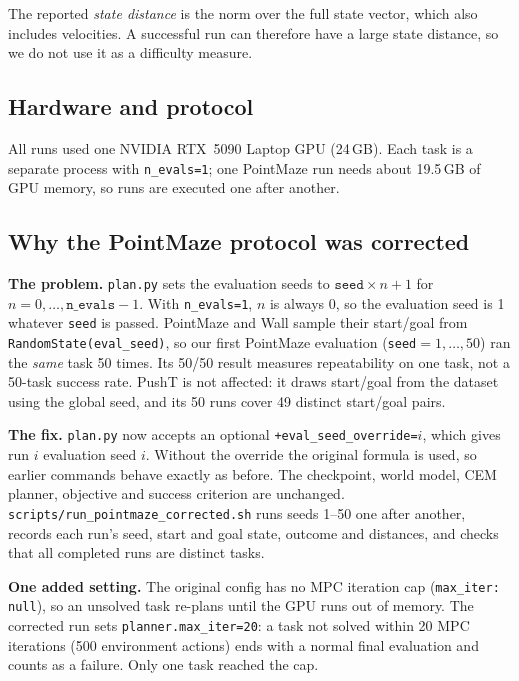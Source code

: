 \documentclass[11pt]{article}
\begin{document}
The reported \emph{state distance} is the norm over the full state vector,
which also includes velocities. A successful run can therefore have a
large state distance, so we do not use it as a difficulty measure.

\subsection{Hardware and protocol}

All runs used one NVIDIA RTX~5090 Laptop GPU (24\,GB). Each task is a separate
process with \texttt{n\_evals=1}; one PointMaze run needs about 19.5\,GB of GPU
memory, so runs are executed one after another.

\subsection{Why the PointMaze protocol was corrected}
\label{sec:seed}

\textbf{The problem.} \texttt{plan.py} sets the evaluation seeds to
$\texttt{seed}\times n + 1$ for $n = 0,\dots,\texttt{n\_evals}-1$. With
\texttt{n\_evals=1}, $n$ is always 0, so the evaluation seed is 1 whatever
\texttt{seed} is passed. PointMaze and Wall sample their start/goal from
\texttt{RandomState(eval\_seed)}, so our first PointMaze evaluation
(\texttt{seed}$=1,\dots,50$) ran the \emph{same} task 50 times. Its 50/50
result measures repeatability on one task, not a 50-task success rate.
PushT is not affected: it draws start/goal from the dataset using the global
seed, and its 50 runs cover 49 distinct start/goal pairs.

\textbf{The fix.} \texttt{plan.py} now accepts an optional
\texttt{+eval\_seed\_override=}$i$, which gives run $i$ evaluation seed $i$.
Without the override the original formula is used, so earlier commands behave
exactly as before. The checkpoint, world model, CEM planner, objective and
success criterion are unchanged. \texttt{scripts/run\_pointmaze\_corrected.sh}
runs seeds 1--50 one after another, records each run's seed, start and goal
state, outcome and distances, and checks that all completed runs are distinct
tasks.

\textbf{One added setting.} The original config has no MPC iteration cap
(\texttt{max\_iter: null}), so an unsolved task re-plans until the GPU runs out
of memory. The corrected run sets \texttt{planner.max\_iter=20}: a task not
solved within 20 MPC iterations (500 environment actions) ends with a normal
final evaluation and counts as a failure. Only one task reached the cap.
\end{document}
